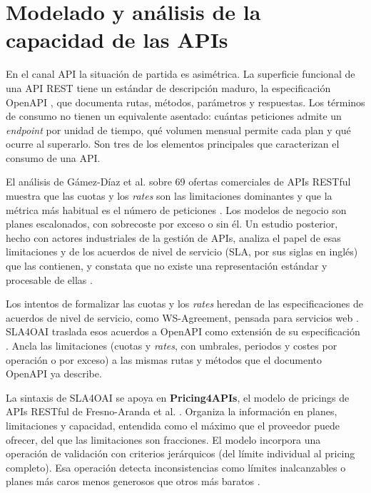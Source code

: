 \section{Modelado y análisis de la capacidad de las APIs}
\label{sec:estado:capacidad}
\label{sec:estado:analisis-capacidad}

En el canal API la situación de partida es asimétrica. La superficie
funcional de una API REST \citep{fielding2000rest} tiene un estándar de
descripción maduro, la especificación OpenAPI
\citep{openapi2025}, que documenta rutas, métodos, parámetros y
respuestas. Los términos de consumo no tienen un equivalente
asentado: cuántas peticiones admite un \textit{endpoint} por unidad de tiempo,
qué volumen mensual permite cada plan y qué ocurre al superarlo. Son
tres de los elementos principales que caracterizan el consumo de una API.

El análisis de Gámez-Díaz et al. sobre 69 ofertas comerciales de APIs
RESTful muestra que las cuotas y los \textit{rates} son las limitaciones
dominantes y que la métrica más habitual es el número de peticiones
\citep{gamezdiaz2017offerings}. Los modelos de negocio son planes
escalonados, con sobrecoste por exceso o sin él. Un estudio posterior,
hecho con actores industriales de la gestión de APIs, analiza el papel de
esas limitaciones y de los acuerdos de nivel de servicio (SLA, por sus
siglas en inglés) que las contienen, y constata que no existe una
representación estándar y procesable de ellas
\citep{gamezdiaz2019limitations}.

Los intentos de formalizar las cuotas y los \textit{rates} heredan de las
especificaciones de acuerdos de nivel de servicio, como WS-Agreement,
pensada para servicios web \citep{andrieux2007wsagreement}. SLA4OAI
traslada esos acuerdos a OpenAPI como extensión de su
especificación \citep{gamezdiaz2019sla4oai}. Ancla las limitaciones (cuotas y
\textit{rates}, con umbrales, periodos y costes por operación o por
exceso) a las mismas rutas y métodos que el documento OpenAPI ya
describe.

La sintaxis de SLA4OAI se apoya en \textbf{Pricing4APIs}, el modelo de
pricings de APIs RESTful de Fresno-Aranda et al.
\citep{fresno2025pricing4apis}. Organiza la
información en planes, limitaciones y capacidad, entendida como el
máximo que el proveedor puede ofrecer, del que las limitaciones son
fracciones. El modelo incorpora una operación de validación con
criterios jerárquicos (del límite individual al pricing completo). Esa
operación detecta inconsistencias como límites inalcanzables o planes
más caros menos generosos que otros más baratos
\citep{fresno2025pricing4apis}.

